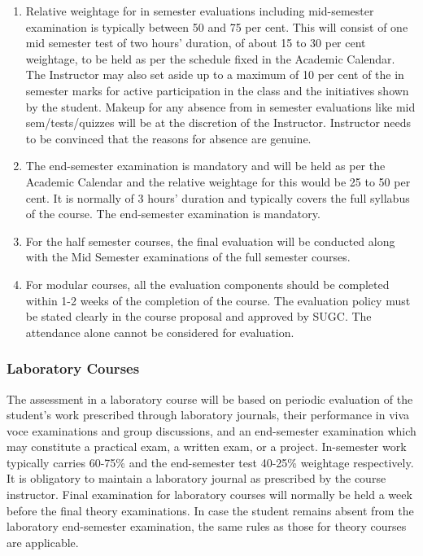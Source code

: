 \begin{enumerate}
    \item Relative weightage for in semester evaluations including mid-semester examination is typically between 50 and 75 per cent. This will consist of one mid semester test of two hours’ duration, of about 15 to 30 per cent weightage, to be held as per the schedule fixed in the Academic Calendar. The Instructor may also set aside up to a maximum of 10 per cent of the in semester marks for active participation in the class and the initiatives shown by the student. Makeup for any absence from in semester evaluations like mid sem/tests/quizzes will be at the discretion of the Instructor. Instructor needs to be convinced that the reasons for absence are genuine. 
    \item The end-semester examination is mandatory and will be held as per the Academic Calendar and the relative weightage for this would be 25 to 50 per cent. It is normally of 3 hours’ duration and typically covers the full syllabus of the course. The end-semester examination is mandatory. 
    \item For the half semester courses, the final evaluation will be conducted along with the Mid Semester examinations of the full semester courses.
    \item For modular courses, all the evaluation components should be completed within 1-2 weeks of the completion of the course. The evaluation policy must be stated clearly in the course proposal and approved by SUGC. The attendance alone cannot be considered for evaluation.
\end{enumerate}

\subsubsection{Laboratory Courses}

The assessment in a laboratory course will be based on periodic evaluation of the student’s work prescribed through laboratory journals, their performance in viva voce examinations and group discussions, and an end-semester examination which may constitute a practical exam, a written exam, or a project. In-semester work typically carries 60-75\% and the end-semester test 40-25\% weightage respectively. It is obligatory to maintain a laboratory journal as prescribed by the course instructor. Final examination for laboratory courses will normally be held a week before the final theory examinations. In case the student remains absent from the laboratory end-semester examination, the same rules as those for theory courses are applicable.


